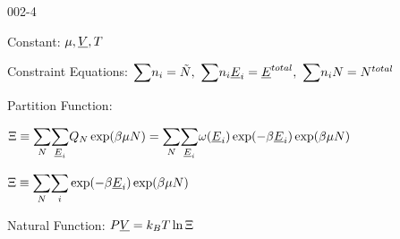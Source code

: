\begin{mitframe}{002-4} %

    
	\begin{listone}
    
    	\item Constant: $\chempot, \uline{\vol}, \Temp$

   	 	\item Constraint Equations: $\mathlarger\sum\nolimits \molspecies{i} = \totmoles,~\mathlarger\sum\nolimits \molspecies{i}\uline{\energy}_{i} = \uline{\energy}^{total},~\mathlarger\sum\nolimits \molspecies{i}\nummoles = \nummoles^{total}$
    
    	\item Partition Function:
    
    	\begin{listtwo}
        
    		\item $\gcpf \equiv \mathlarger\sum\limits_{\nummoles}\mathlarger\sum\limits_{\uline{\energy}_{i}} \cpf\exp(\boltznorm\chempot\nummoles) = \mathlarger\sum\limits_{\nummoles}\mathlarger\sum\limits_{\uline{\energy}_{i}} \mpf(\uline{\energy}_{i})\exp(-\boltznorm\uline{\energy}_{i})\exp(\boltznorm\chempot\nummoles) $

    		\item $\gcpf \equiv \mathlarger\sum\limits_{\nummoles}\mathlarger\sum\limits_{i} \exp(-\boltznorm\uline{\energy}_{i})\exp(\boltznorm\chempot\nummoles) $
    
    	\end{listtwo}
    
    \item Natural Function: $\p\uline{\vol} = \boltz\Temp\ln\gcpf$   
    
	\end{listone}
    
\end{mitframe}